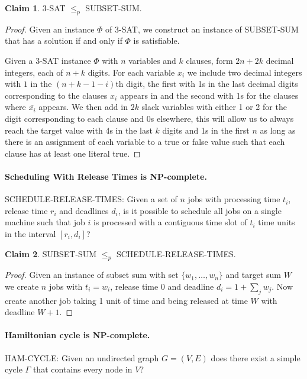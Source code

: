 \documentclass[11pt,a4paper]{article}
\theoremstyle{definition}
\newtheorem{claim}{Claim}
\begin{document}
\begin{claim}
3-SAT $\le_p$ SUBSET-SUM.
\end{claim}
\begin{proof}
Given an instance $\Phi$ of 3-SAT, we construct an instance of SUBSET-SUM that has a solution if and only if $\Phi$ is satisfiable.

Given a 3-SAT instance $\Phi$ with $n$ variables and $k$ clauses, form $2n + 2k$ decimal integers, each of $n+k$ digits.
For each variable $x_i$ we include two decimal integers with $1$ in the $(n+k-1-i)$th digit, the first with 1s in the last decimal digits corresponding to the clauses $x_i$ appears in and the second with 1s for the clauses where $\overline{x_i}$ appears.
We then add in $2k$ slack variables with either 1 or 2 for the digit corresponding to each clause and 0s elsewhere, this will allow us to always reach the target value with 4s in the last $k$ digits and 1s in the first $n$ as long as there is an assignment of each variable to a true or false value such that each clause has at least one literal true.
\end{proof}

\paragraph{Scheduling With Release Times is NP-complete.}
SCHEDULE-RELEASE-TIMES: Given a set of $n$ jobs with processing time $t_i$, release time $r_i$ and deadlines $d_i$, is it possible to schedule all jobs on a single machine such that job $i$ is processed with a contiguous time slot of $t_i$ time units in the interval $[r_i, d_i]$?

\begin{claim}
SUBSET-SUM $\le_p$ SCHEDULE-RELEASE-TIMES.
\end{claim}
\begin{proof}
Given an instance of subset sum with set $\{w_1,\ldots,w_n\}$ and target sum $W$ we create $n$ jobs with $t_i = w_i$, release time $0$ and deadline $d_i = 1 + \sum_{j} w_j$.
Now create another job taking 1 unit of time and being released at time $W$ with deadline $W +1$.
\end{proof}

\paragraph{Hamiltonian cycle is NP-complete.}
HAM-CYCLE: Given an undirected graph $G = (V,E)$ does there exist a simple cycle $\Gamma$ that contains every node in $V$?
\end{document}
